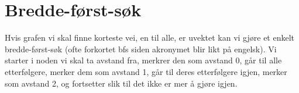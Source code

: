 \section{Bredde-først-søk}
Hvis grafen vi skal finne korteste vei, en til alle, er uvektet kan vi gjøre et enkelt bredde-først-søk (ofte forkortet bfs siden akronymet blir likt på engelsk). Vi starter i noden vi skal ta avstand fra, merkrer den som avstand 0, går til alle etterfølgere, merker dem som avstand 1, går til deres etterfølgere igjen, merker som avstand 2, og fortsetter slik til det ikke er mer å gjøre igjen.